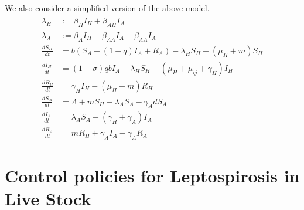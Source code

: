 \documentclass[11pt]{amsart}
\theoremstyle{definition}
\numberwithin{equation}{section}
\begin{document}
We also consider a simplified version of the above model.
    \begin{equation}
        \begin{aligned}
            \lambda_H &:= \beta_H I_H + \bar{\beta}_{AH} I_A
            \\
            \lambda_A &:= \beta_A I_H + \bar{\beta}_{AA} I_A
                + \beta_{AA} I_A
        \\
            \frac{d S_H}{dt} &=
            b (S_A + (1 - q) I_A + R_A)
            -\lambda_H S_H - (\mu_H + m) S_H 
        \\
            \frac{d I_H}{dt} &=
            (1 - \sigma)  q  b  I_A
            + \lambda_H S_H - (\mu_H + \mu_{ij} + \gamma_H)I_H
        \\
            \frac{d R_H}{dt} &=
            \gamma_H I_H - (\mu_H + m) R_H
        \\
            \frac{dS_A}{dt} &=
            \Lambda + m S_H - \lambda_A S_A - \gamma_A dS_A
        \\
            \frac{d I_A}{dt} &=
            \lambda_A S_A - (\gamma_H + \gamma_A)   I_A
        \\
            \frac{dR_A}{dt} &=
            m R_H + \gamma_A I_A - \gamma_A R_A
    \end{aligned}
\end{equation}

    \section{Control policies for Leptospirosis in Live Stock }
\end{document}
